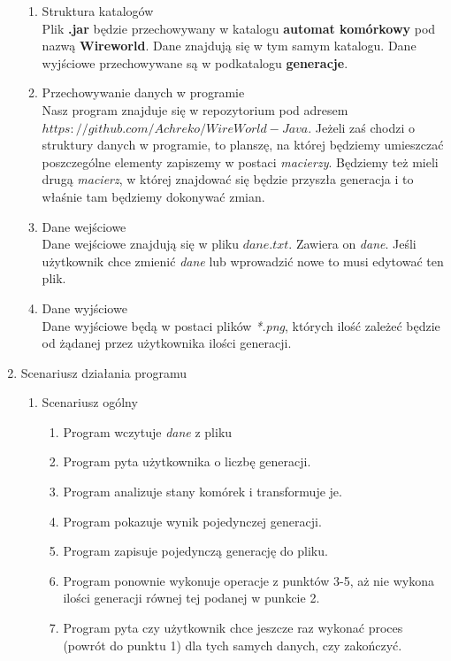 \documentclass[11pt]{article}
\begin{document}
\begin{enumerate}
\begin{enumerate}[label=\arabic{enumi}.\arabic*.]
 \item Struktura katalogów\\
 Plik \textbf{.jar} będzie przechowywany w katalogu \textbf{automat komórkowy} pod nazwą \textbf{Wireworld}. Dane znajdują się w tym samym katalogu. Dane wyjściowe przechowywane są w podkatalogu \textbf{generacje}.
 \item Przechowywanie danych w programie\\
 Nasz program znajduje się w repozytorium pod adresem $https://github.com/Achreko/WireWorld-Java$. Jeżeli zaś chodzi o struktury danych w programie, to planszę, na której będziemy umieszczać poszczególne elementy zapiszemy w postaci \textit{macierzy}. Będziemy też mieli drugą \textit{macierz}, w której znajdować się będzie przyszła generacja i to właśnie tam będziemy dokonywać zmian.\\
 \item Dane wejściowe\\
 Dane wejściowe znajdują się w pliku $dane.txt$. Zawiera on \textit{dane}.
 Jeśli użytkownik chce zmienić \textit{dane} lub wprowadzić nowe to musi edytować ten plik.\\
 \item Dane wyjściowe\\
 Dane wyjściowe będą w postaci plików \textit{*.png}, których ilość zależeć będzie od żądanej przez użytkownika ilości generacji.
 \end{enumerate}
 

\item Scenariusz działania programu


\begin{enumerate}[label=\arabic{enumi}.\arabic*.]
\item Scenariusz ogólny
\begin{enumerate}[label*=\arabic*.]
\item Program wczytuje \textit{dane} z pliku 
\item Program pyta użytkownika o liczbę generacji.
\item Program analizuje stany komórek i transformuje je.
\item Program pokazuje wynik pojedynczej generacji.
\item Program zapisuje pojedynczą generację do pliku.
\item Program ponownie wykonuje operacje z punktów 3-5, aż nie wykona ilości generacji równej tej 		podanej w punkcie 2.
\item Program pyta czy użytkownik chce jeszcze raz wykonać proces (powrót do punktu 1) dla tych 		samych danych, czy zakończyć.\\
\end{enumerate}




\end{enumerate}
\end{enumerate}
\end{document}
